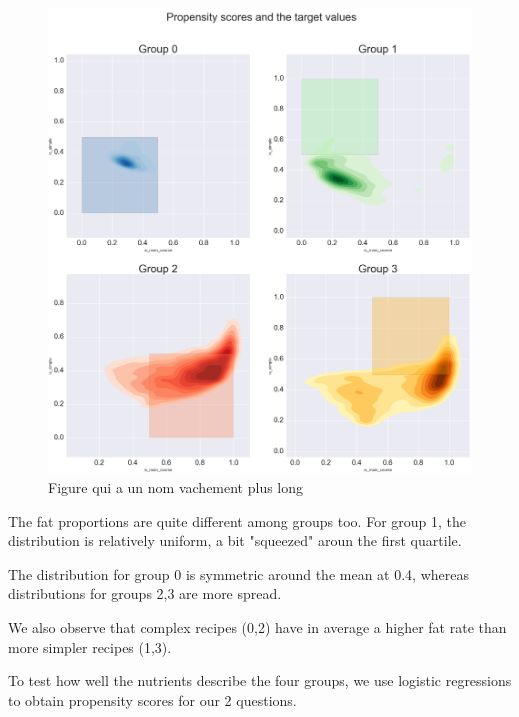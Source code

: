 \documentclass[11pt]{article}
\begin{document}
\begin{figure}[!h]
	\includegraphics[width=\columnwidth]{../propensity-r.png}
	\caption{Figure qui a un nom vachement plus long}
	\label{fig:4}
\end{figure}

The fat proportions are quite different among groups too. For group 1, the distribution is relatively uniform, a bit "squeezed" aroun the first quartile.

The distribution for group 0 is symmetric around the mean at 0.4, whereas distributions for groups 2,3 are more spread.

We also observe that complex recipes (0,2) have in average a higher fat rate than more simpler recipes (1,3).


To test how well the nutrients describe the four groups, we use logistic regressions to obtain propensity scores for our 2 questions.
\end{document}
